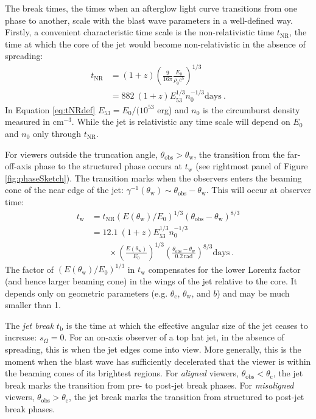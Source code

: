 \documentclass[twocolumn]{aastex62}
\newcommand{\tW}{\ensuremath{t_{\mathrm{w}}}}
\newcommand{\tNR}{\ensuremath{t_{\mathrm{NR}}}}
\newcommand{\tb}{\ensuremath{t_{\mathrm{b}}}}
\newcommand{\thobs}{\ensuremath{\theta_{\mathrm{obs}}}}
\newcommand{\thW}{\ensuremath{\theta_{\mathrm{w}}}}
\newcommand{\thC}{\ensuremath{\theta_{\mathrm{c}}}}
\newcommand{\som}{\ensuremath{s_{\Omega}}}
\begin{document}
The break times, the times when an afterglow light curve transitions from one phase to another, scale with the blast wave parameters in a well-defined way. Firstly, a convenient characteristic time scale is the non-relativistic time $\tNR$, the time at which the core of the jet would become non-relativistic in the absence of spreading:
\begin{align}
	\tNR &= (1+z) \left( \frac{9}{16\pi} \frac{E_0}{\rho_0 c^5} \right)^{1/3}  \label{eq:tNRdef} \\
	&= 882 \ (1+z) E_{53}^{1/3}n_0^{-1/3} \mathrm{ days}\ . \nonumber
\end{align}
In Equation \eqref{eq:tNRdef} $E_{53} = E_0 / (10^{53}$ erg) and $n_0$ is the circumburst density measured in cm$^{-3}$.  While the jet is relativistic any time scale will depend on $E_0$ and $n_0$ only through $\tNR$.

For viewers outside the truncation angle, $\thobs > \thW$, the transition from the far-off-axis phase to the structured phase occurs at $\tW$ (see rightmost panel of Figure \ref{fig:phaseSketch}).  The transition marks when the observers enters the beaming cone of the near edge of the jet: $\gamma^{-1}(\thW) \sim \thobs-\thW$.  This will occur at observer time:
\begin{align}
	\tW &= \tNR \left(E(\thW) / E_0\right)^{1/3} \left( \thobs-\thW \right)^{8/3}  \label{eq:tw} \\
	&= 12.1 \ (1+z) E_{53}^{1/3} n_0^{-1/3} \nonumber \\
	& \qquad \times \left(\frac{E(\thW) }{ E_0}\right)^{1/3} \left( \frac{\thobs-\thW}{0.2\ \mathrm{ rad}} \right)^{8/3}  \mathrm{ days}\ .
\end{align}
The factor of $(E(\thW) / E_0)^{1/3}$ in $\tW$ compensates for the lower Lorentz factor (and hence larger beaming cone) in the wings of the jet relative to the core.  It depends only on geometric parameters (e.g. $\thC$, $\thW$, and $b$) and may be much smaller than 1.

The \emph{jet break} $\tb$ is the time at which the effective angular size of the jet ceases to increase: $\som = 0$.  For an on-axis observer of a top hat jet, in the absence of spreading, this is when the jet edges come into view.  More generally, this is the moment when the blast wave has sufficiently decelerated that the viewer is within the beaming cones of its brightest regions.  For \emph{aligned} viewers, $\thobs < \thC$, the jet break marks the transition from pre- to post-jet break phases.  For \emph{misaligned} viewers, $\thobs > \thC$, the jet break marks the transition from structured to post-jet break phases.
\end{document}
